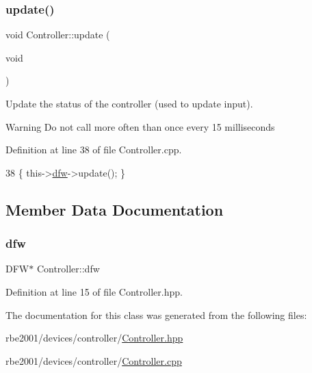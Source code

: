 \subsubsection{\texorpdfstring{update()}{update()}}
{\footnotesize\ttfamily void Controller\+::update (\begin{DoxyParamCaption}\item[{void}]{ }\end{DoxyParamCaption})}



Update the status of the controller (used to update input). 

\begin{DoxyWarning}{Warning}
Do not call more often than once every 15 milliseconds 
\end{DoxyWarning}


Definition at line 38 of file Controller.\+cpp.


\begin{DoxyCode}
38 \{ this->\hyperlink{class_controller_af4793ccbf2ecdbfcdb9359bd32b6e8cf}{dfw}->update(); \}
\end{DoxyCode}


\subsection{Member Data Documentation}
\mbox{\label{class_controller_af4793ccbf2ecdbfcdb9359bd32b6e8cf}} 
\subsubsection{\texorpdfstring{dfw}{dfw}}
{\footnotesize\ttfamily D\+FW$\ast$ Controller\+::dfw\hspace{0.3cm}{\ttfamily [private]}}



Definition at line 15 of file Controller.\+hpp.



The documentation for this class was generated from the following files\+:\begin{DoxyCompactItemize}
\item 
rbe2001/devices/controller/\hyperlink{_controller_8hpp}{Controller.\+hpp}\item 
rbe2001/devices/controller/\hyperlink{_controller_8cpp}{Controller.\+cpp}\end{DoxyCompactItemize}
